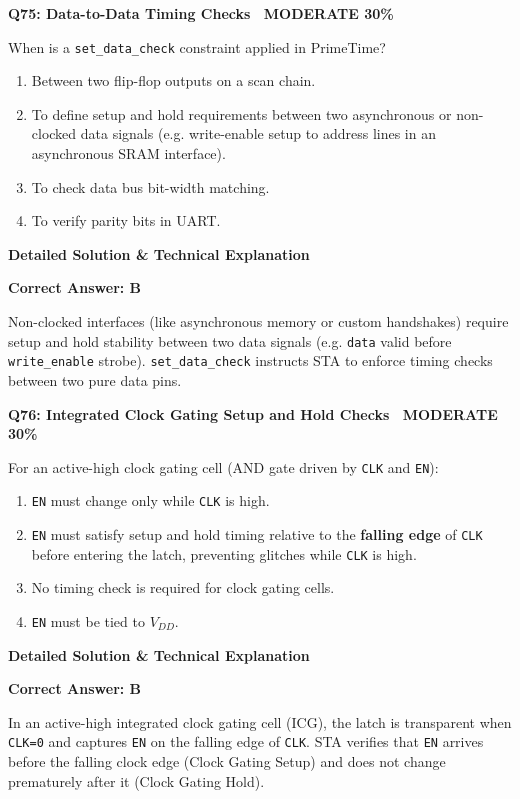 \documentclass[11pt,a4paper]{article}
\newcommand{\badgemod}{{\color{white}\colorbox{modoran}{\bfseries\sffamily\tiny\ MODERATE 30\%\ }}}
\newenvironment{qbox}[2]{%
  \begin{mdframed}[style=qstyle]%
  {\bfseries\sffamily\color{primaryblue}#1 \hfill #2}\par\vspace{2pt}%
}{%
  \end{mdframed}%
}
\newenvironment{ansbox}{%
  \begin{mdframed}[style=ansstyle]%
  {\bfseries\sffamily\color{ansgreen}\small Detailed Solution \& Technical Explanation}\par\vspace{2pt}\small%
}{%
  \end{mdframed}%
}
\begin{document}
\begin{qbox}{Q75: Data-to-Data Timing Checks}{\badgemod}
When is a \texttt{set\_data\_check} constraint applied in PrimeTime?
\begin{enumerate}[label=\textbf{\Alph*.}]
  \item Between two flip-flop outputs on a scan chain.
  \item To define setup and hold requirements between two asynchronous or non-clocked data signals (e.g. write-enable setup to address lines in an asynchronous SRAM interface).
  \item To check data bus bit-width matching.
  \item To verify parity bits in UART.
\end{enumerate}
\end{qbox}
\begin{ansbox}
\textbf{Correct Answer: B}

Non-clocked interfaces (like asynchronous memory or custom handshakes) require setup and hold stability between two data signals (e.g. \texttt{data} valid before \texttt{write\_enable} strobe). \texttt{set\_data\_check} instructs STA to enforce timing checks between two pure data pins.
\end{ansbox}

\begin{qbox}{Q76: Integrated Clock Gating Setup and Hold Checks}{\badgemod}
For an active-high clock gating cell (AND gate driven by \texttt{CLK} and \texttt{EN}):
\begin{enumerate}[label=\textbf{\Alph*.}]
  \item \texttt{EN} must change only while \texttt{CLK} is high.
  \item \texttt{EN} must satisfy setup and hold timing relative to the \textbf{falling edge} of \texttt{CLK} before entering the latch, preventing glitches while \texttt{CLK} is high.
  \item No timing check is required for clock gating cells.
  \item \texttt{EN} must be tied to $V_{DD}$.
\end{enumerate}
\end{qbox}
\begin{ansbox}
\textbf{Correct Answer: B}

In an active-high integrated clock gating cell (ICG), the latch is transparent when \texttt{CLK=0} and captures \texttt{EN} on the falling edge of \texttt{CLK}. STA verifies that \texttt{EN} arrives before the falling clock edge (Clock Gating Setup) and does not change prematurely after it (Clock Gating Hold).
\end{ansbox}
\end{document}
